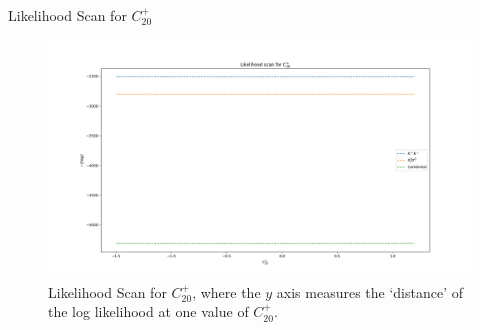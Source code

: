 \begin{frame}{Likelihood Scan for $C_{20}^{+}$}
\begin{figure}
    \centering
        \includegraphics[width=\textwidth]{2020_04_23/figs/P20.png}
    \caption{Likelihood Scan for $C_{20}^{+}$, where the $y$ axis measures the `distance' of the log likelihood at one value of $C_{20}^{+}$.}
    \label{fig:scanCP20}
\end{figure}
\end{frame}



